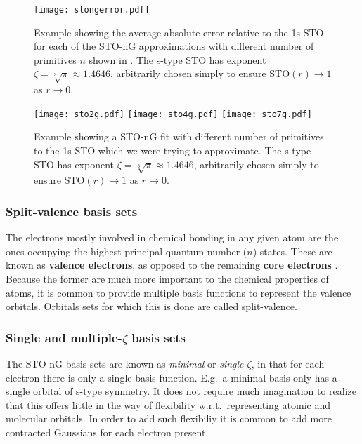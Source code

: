 \documentclass[../../master.tex]{subfiles}
\begin{document}
\begin{SCfigure}
\centering
\texttt{[image: stongerror.pdf]}
\caption{Example showing the average absolute error relative to the 1s STO  for each of the STO-nG approximations with different number of primitives $n$ shown in . The s-type STO has exponent $\zeta=\sqrt[3]{\pi}\approx1.4646$, arbitrarily chosen simply to ensure $\text{STO}(r)\rightarrow1$ as $r\rightarrow0$. \label{fig:stoerror}}
\end{SCfigure}



\begin{figure}
\centering
\texttt{[image: sto2g.pdf]}
\texttt{[image: sto4g.pdf]}
\texttt{[image: sto7g.pdf]}
\caption{Example showing a STO-nG fit with different number of primitives to the 1s STO which we were trying to approximate. The s-type STO has exponent $\zeta=\sqrt[3]{\pi}\approx1.4646$, arbitrarily chosen simply to ensure $\text{STO}(r)\rightarrow1$ as $r\rightarrow0$. \label{fig:sto24g}}
\end{figure}

\subsubsection{Split-valence basis sets}
The electrons mostly involved in chemical bonding in any given atom are the ones occupying the highest principal quantum number ($n$) states. These are known as {\bf valence electrons}, as opposed to the remaining {\bf core electrons} \cite{zumdahl}. Because the former are much more important to the chemical properties of atoms, it is common to provide multiple basis functions to represent the valence orbitals. Orbitals sets for which this is done are called split-valence.


\subsubsection{Single and multiple-$\zeta$ basis sets}
The STO-nG basis sets are known as \emph{minimal} or \emph{single-}$\zeta$, in that for each electron there is only a single basis function. E.g.\ a minimal  basis only has a single orbital of s-type symmetry. It does not require much imagination to realize that this offers little in the way of flexibility w.r.t.\ representing atomic and molecular orbitals. In order to add such flexibiliy it is common to add more contracted Gaussians for each electron present. 
\end{document}
